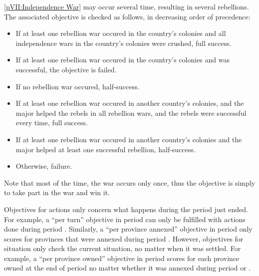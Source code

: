  \label{chVictories:Explanation:Independence}
\ref{pVII:Independence War} may occur several time, resulting in several
rebellions. The associated objective is checked as follows, in
decreasing order of precedence:
\begin{itemize}
\item If at least one rebellion war occured in the country's colonies
  and all independence wars in the country's colonies were crushed, full
  success.
\item If at least one rebellion war occured in the country's colonies
  and was successful, the objective is failed.
\item If no rebellion war occured, half-success.
\item If at least one rebellion war occured in another country's
  colonies, and the major helped the rebels in all rebellion wars, and
  the rebels were successful every time, full success.
\item If at least one rebellion war occured in another country's
  colonies and the major helped at least one successful rebellion,
  half-success.
\item Otherwise, failure.
\end{itemize}
\bparag Note that most of the time, the war occurs only once, thus the
objective is simply to take part in the war and win it.

\aparag[Duration.] Objectives for actions only concern what happens
during the period just ended.
\bparag For example, a ``per turn'' objective in period  can
only be fulfilled with actions done during period
.
\bparag Similarly, a ``per province annexed'' objective in period
 only scores \VPs for provinces that were annexed during
period .
\bparag However, objectives for situation only check the current
situation, no matter when it was settled.
\bparag For example, a ``per province owned'' objective in period
 scores for each province owned at the end of period
 no matter whether it was annexed during period  or
.

